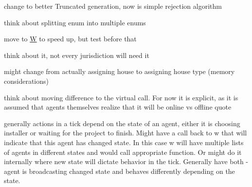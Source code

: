 
\begin{DoxyRefList}
\item[\label{_dev_stage2__DevStage2000026}%
\hypertarget{_dev_stage2__DevStage2000026}{}%
Member \hyperlink{namespaceserialize_aa5ee0bad0c960a3f06430066217d8c12}{serialize\+:\+:solve\+\_\+str\+\_\+formula} (const std\+::string \&formula\+\_\+, I\+Random \&rand\+\_\+)]change to better Truncated generation, now is simple rejection algorithm  
\item[\label{_dev_stage2__DevStage2000025}%
\hypertarget{_dev_stage2__DevStage2000025}{}%
Member \hyperlink{namespacesolar__core_aa1147341e5ef7a40d68d1bd68e149362}{solar\+\_\+core\+:\+:E\+Param\+Types} ]think about splitting enum into multiple enums 
\item[\label{_dev_stage2__DevStage2000001}%
\hypertarget{_dev_stage2__DevStage2000001}{}%
Member \hyperlink{classsolar__core_1_1_g_a624adac31ade604e0335717bad4fc9cd}{solar\+\_\+core\+:\+:G\+:\+:G} (const Property\+Tree \&pt\+\_\+, \hyperlink{classsolar__core_1_1_w}{W} $\ast$w\+\_\+)]move to \hyperlink{classsolar__core_1_1_w}{W} to speed up, but test before that  
\item[\label{_dev_stage2__DevStage2000002}%
\hypertarget{_dev_stage2__DevStage2000002}{}%
Member \hyperlink{classsolar__core_1_1_g_a33472d3b331a303ec8a9b61e2da163d3}{solar\+\_\+core\+:\+:G\+:\+:schedule\+\_\+visits} ]think about it, not every jurisdiction will need it  
\item[\label{_dev_stage2__DevStage2000007}%
\hypertarget{_dev_stage2__DevStage2000007}{}%
Class \hyperlink{classsolar__core_1_1_household}{solar\+\_\+core\+:\+:Household} ]might change from actually assigning house to assigning house type (memory considerations) 
\item[\label{_dev_stage2__DevStage2000004}%
\hypertarget{_dev_stage2__DevStage2000004}{}%
Member \hyperlink{classsolar__core_1_1_household_a165b7c64c72e5ed4ea08307e32082517}{solar\+\_\+core\+:\+:Household\+:\+:ac\+\_\+inf\+\_\+quoting\+\_\+sei} ()]think about moving difference to the virtual call. For now it is explicit, as it is assumed that agents themselves realize that it will be online vs offline quote  
\item[\label{_dev_stage2__DevStage2000006}%
\hypertarget{_dev_stage2__DevStage2000006}{}%
Member \hyperlink{classsolar__core_1_1_household_a1e7d20a60dc42b8d09a8d23a4cdb26a6}{solar\+\_\+core\+:\+:Household\+:\+:act\+\_\+tick} ()]generally actions in a tick depend on the state of an agent, either it is choosing installer or waiting for the project to finish. Might have a call back to w that will indicate that this agent has changed state. In this case w will have multiple lists of agents in different states and would call appropriate function. Or might do it internally where new state will dictate behavior in the tick. Generally have both -\/ agent is broadcasting changed state and behaves differently depending on the state.  

\end{DoxyRefList}
